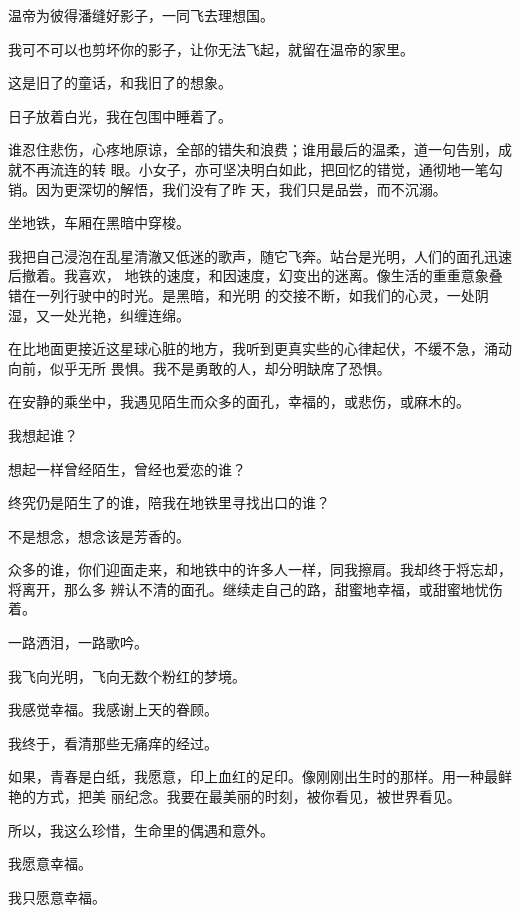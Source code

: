 		温帝为彼得潘缝好影子，一同飞去理想国。

		我可不可以也剪坏你的影子，让你无法飞起，就留在温帝的家里。

		这是旧了的童话，和我旧了的想象。

		日子放着白光，我在包围中睡着了。

	\endwriting



		谁忍住悲伤，心疼地原谅，全部的错失和浪费；谁用最后的温柔，道一句告别，成就不再流连的转
	眼。小女子，亦可坚决明白如此，把回忆的错觉，通彻地一笔勾销。因为更深切的解悟，我们没有了昨
	天，我们只是品尝，而不沉溺。

		坐地铁，车厢在黑暗中穿梭。

		我把自己浸泡在乱星清澈又低迷的歌声，随它飞奔。站台是光明，人们的面孔迅速后撤着。我喜欢，
	地铁的速度，和因速度，幻变出的迷离。像生活的重重意象叠错在一列行驶中的时光。是黑暗，和光明
	的交接不断，如我们的心灵，一处阴湿，又一处光艳，纠缠连绵。

		在比地面更接近这星球心脏的地方，我听到更真实些的心律起伏，不缓不急，涌动向前，似乎无所
	畏惧。我不是勇敢的人，却分明缺席了恐惧。

		在安静的乘坐中，我遇见陌生而众多的面孔，幸福的，或悲伤，或麻木的。

		我想起谁？\par
		想起一样曾经陌生，曾经也爱恋的谁？\par
		终究仍是陌生了的谁，陪我在地铁里寻找出口的谁？\par
		不是想念，想念该是芳香的。

		众多的谁，你们迎面走来，和地铁中的许多人一样，同我擦肩。我却终于将忘却，将离开，那么多
	辨认不清的面孔。继续走自己的路，甜蜜地幸福，或甜蜜地忧伤着。

		一路洒泪，一路歌吟。\par
		我飞向光明，飞向无数个粉红的梦境。\par
		我感觉幸福。我感谢上天的眷顾。\par
		我终于，看清那些无痛痒的经过。

		如果，青春是白纸，我愿意，印上血红的足印。像刚刚出生时的那样。用一种最鲜艳的方式，把美
	丽纪念。我要在最美丽的时刻，被你看见，被世界看见。

		所以，我这么珍惜，生命里的偶遇和意外。

		我愿意幸福。

		我只愿意幸福。

	\endwriting



